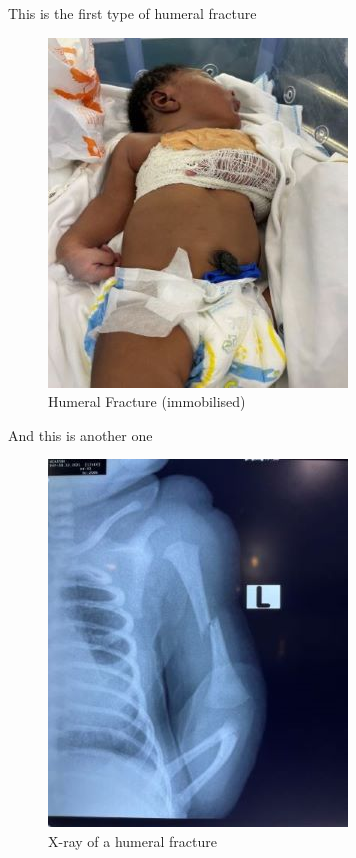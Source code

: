 \documentclass[
  letterpaper,
  DIV=11,
  numbers=noendperiod]{scrreprt}
\begin{document}
This is the first type of humeral fracture

\begin{figure}

{\centering \includegraphics{humeral-fracture-1.jpg}

}

\caption{Humeral Fracture (immobilised)}

\end{figure}

And this is another one

\begin{figure}

\includegraphics{humeral-fracture-2.jpg} \hfill{}

\caption{X-ray of a humeral fracture}

\end{figure}
\end{document}
